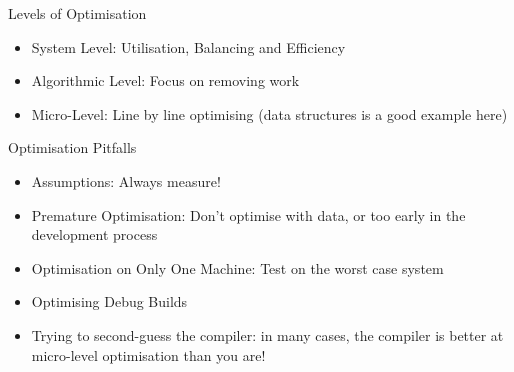 \begin{frame}{Levels of Optimisation}
	\begin{itemize}
		\pause \item System Level: Utilisation, Balancing and Efficiency
		\pause \item Algorithmic Level: Focus on removing work
		\pause \item Micro-Level: Line by line optimising (data structures is a good example here)
	\end{itemize}
\end{frame}

\begin{frame}{Optimisation Pitfalls}
	\begin{itemize}
		\pause \item Assumptions: Always measure!
		\pause \item Premature Optimisation: Don't optimise with data, or too early in the development process
		\pause \item Optimisation on Only One Machine: Test on the worst case system
        \pause \item Optimising Debug Builds
        \pause \item Trying to second-guess the compiler: in many cases, the compiler is better at micro-level optimisation than you are!
	\end{itemize}
\end{frame}

